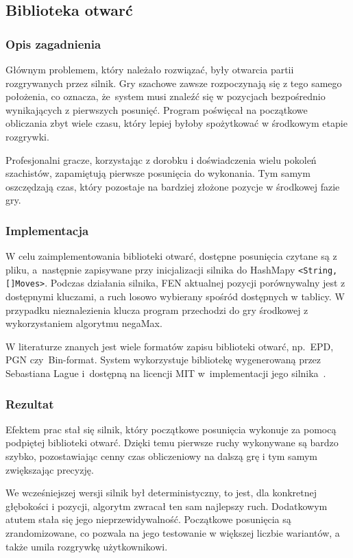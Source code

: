 \subsection{Biblioteka otwarć}
\label{subsec:biblioteka-otwarc}

\subsubsection{Opis zagadnienia}
Głównym problemem, który należało rozwiązać, były otwarcia partii rozgrywanych przez silnik.
Gry szachowe zawsze rozpoczynają się z tego samego położenia, co oznacza, że~system musi znaleźć się w pozycjach bezpośrednio wynikających z pierwszych posunięć.
Program poświęcał na początkowe obliczania zbyt wiele czasu, który lepiej byłoby spożytkować w środkowym etapie rozgrywki.

Profesjonalni gracze, korzystając z dorobku i doświadczenia wielu pokoleń szachistów, zapamiętują pierwsze posunięcia do wykonania.
Tym samym oszczędzają czas, który pozostaje na bardziej złożone pozycje w środkowej fazie gry.

\subsubsection{Implementacja}
W celu zaimplementowania biblioteki otwarć, dostępne posunięcia czytane są z pliku, a~następnie zapisywane przy inicjalizacji silnika do HashMapy \texttt{<String, []Moves>}.
Podczas działania silnika, FEN aktualnej pozycji porównywalny jest z dostępnymi kluczami, a ruch losowo wybierany spośród dostępnych w tablicy.
W przypadku nieznalezienia klucza program przechodzi do gry środkowej z wykorzystaniem algorytmu negaMax.

W literaturze znanych jest wiele formatów zapisu biblioteki otwarć, np.\ EPD, PGN czy~Bin-format.
System wykorzystuje bibliotekę wygenerowaną przez Sebastiana Lague i~dostępną na licencji MIT w~implementacji jego silnika~\cite*{opening-library}.
\subsubsection{Rezultat}
Efektem prac stał się silnik, który początkowe posunięcia wykonuje za pomocą podpiętej biblioteki otwarć.
Dzięki temu pierwsze ruchy wykonywane są bardzo szybko, pozostawiając cenny czas obliczeniowy na dalszą grę i tym samym zwiększając precyzję.

We wcześniejszej wersji silnik był deterministyczny, to jest, dla konkretnej głębokości i pozycji, algorytm zwracał ten sam najlepszy ruch.
Dodatkowym atutem stała się jego nieprzewidywalność.
Początkowe posunięcia są zrandomizowane, co pozwala na jego testowanie w większej liczbie wariantów, a także umila rozgrywkę użytkownikowi.
